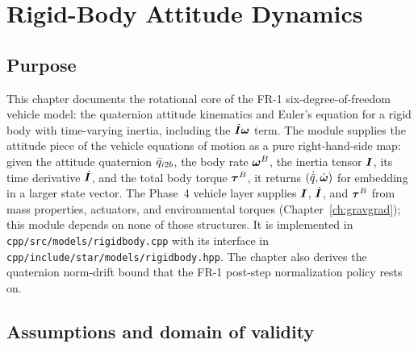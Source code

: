 \chapter{Rigid-Body Attitude Dynamics}
\label{ch:rigidbody}

\section{Purpose}
\label{sec:rigidbody:purpose}

This chapter documents the rotational core of the FR-1 six-degree-of-freedom
vehicle model: the quaternion attitude kinematics and Euler's equation for a
rigid body with time-varying inertia, including the $\dot{\bm{I}}\bm{\omega}$
term. The module supplies the attitude piece of the vehicle equations of
motion as a pure right-hand-side map: given the attitude quaternion
$\bar{q}_{i2b}$, the body rate $\bm{\omega}^{B}$, the inertia tensor
$\bm{I}$, its time derivative $\dot{\bm{I}}$, and the total body torque
$\bm{\tau}^{B}$, it returns $(\dot{\bar{q}}, \dot{\bm{\omega}})$ for
embedding in a larger state vector. The Phase~4 vehicle layer supplies
$\bm{I}$, $\dot{\bm{I}}$, and $\bm{\tau}^{B}$ from mass properties,
actuators, and environmental torques (Chapter~\ref{ch:gravgrad}); this module
depends on none of those structures. It is implemented in
\texttt{cpp/src/models/rigidbody.cpp} with its interface in
\texttt{cpp/include/star/models/rigidbody.hpp}. The chapter also derives the
quaternion norm-drift bound that the FR-1 post-step normalization policy
rests on.

\section{Assumptions and domain of validity}
\label{sec:rigidbody:domain}

